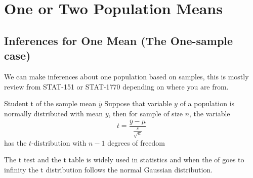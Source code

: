 \documentclass[../STAT-252-Notes.tex]{subfiles}
\begin{document}
\chapter{One or Two Population Means  }
\section{Inferences for One Mean (The One-sample case)}
We can make inferences about one population based on samples, this is mostly review from STAT-151 or STAT-1770 depending on where you are from.
\begin{Definition}
  {Student t}
  of the sample mean $\overline{y}$ Suppose that variable $y$ of a population is normally distributed with mean $\overline{y}$, then for sample of size $n$, the variable  
  \[ 
  t=\frac{\overline{y}-\mu}{\frac{s}{\sqrt{n} }} 
  \] 
  has the $t$-distribution with $n-1$ degrees of freedom        
\end{Definition}
The t test and the t table is widely used in statistics and when the of goes to infinity the t distribution follows the normal Gaussian distribution. 
\end{document}
